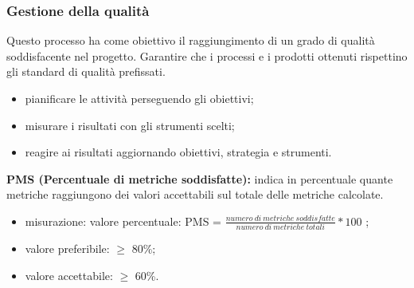\subsubsection{Gestione della qualità}
Questo processo ha come obiettivo il raggiungimento di un grado di qualità soddisfacente nel progetto.
Garantire che i processi e i prodotti ottenuti rispettino gli standard di qualità prefissati.
\begin{itemize}
    \item pianificare le attività perseguendo gli obiettivi;
    \item misurare i risultati con gli strumenti scelti;
    \item reagire ai risultati aggiornando obiettivi, strategia e strumenti.
\end{itemize}
\textbf{PMS (Percentuale di metriche soddisfatte):} indica in percentuale quante metriche raggiungono dei valori accettabili sul totale delle metriche calcolate.
\begin{itemize}
    \item misurazione: valore percentuale: PMS = $\frac{numero \ di \ metriche \ soddisfatte}{numero \ di \ metriche \ totali} * 100$ ;
    \item valore preferibile: $\geq$ 80\%;
    \item valore accettabile: $\geq$ 60\%.
\end{itemize}
\newpage





